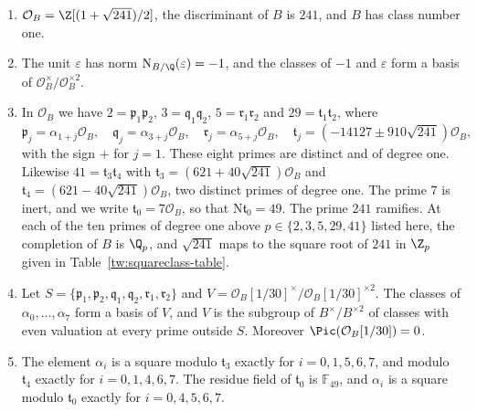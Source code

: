 \begin{lemma}\label{tw:base}
\begin{enumerate}
\item[(a)] $\mathcal O_B=\Z[(1+\sqrt{241})/2]$, the discriminant of $B$ is
 $241$, and $B$ has class number one.
\item[(b)] The unit $\varepsilon$ has norm $\mathrm N_{B/\Q}(\varepsilon)=-1$, and the
 classes of $-1$ and $\varepsilon$ form a basis of
 $\mathcal O_B^\times/\mathcal O_B^{\times2}$.
\item[(c)] In $\mathcal O_B$ we have $2=\mathfrak p_1\mathfrak p_2$,
 $3=\mathfrak q_1\mathfrak q_2$, $5=\mathfrak r_1\mathfrak r_2$ and
 $29=\mathfrak t_1\mathfrak t_2$, where
 \[
  \mathfrak p_j=\alpha_{1+j}\mathcal O_B,\quad
  \mathfrak q_j=\alpha_{3+j}\mathcal O_B,\quad
  \mathfrak r_j=\alpha_{5+j}\mathcal O_B,\quad
  \mathfrak t_j=(-14127\pm910\sqrt{241})\mathcal O_B,
 \]
 with the sign $+$ for $j=1$. These eight primes are distinct and of degree
 one. Likewise $41=\mathfrak t_3\mathfrak t_4$ with
 $\mathfrak t_3=(621+40\sqrt{241})\mathcal O_B$ and
 $\mathfrak t_4=(621-40\sqrt{241})\mathcal O_B$, two distinct primes of degree
 one. The prime $7$ is inert, and we write $\mathfrak t_0=7\mathcal O_B$, so
 that $\mathrm N\mathfrak t_0=49$. The prime $241$ ramifies. At each of the ten
 primes of degree one above $p\in\{2,3,5,29,41\}$ listed here, the completion
 of $B$ is $\Q_p$, and $\sqrt{241}$ maps to the square root of $241$ in $\Z_p$
 given in Table~\ref{tw:squareclass-table}.
\item[(d)] Let $S=\{\mathfrak p_1,\mathfrak p_2,\mathfrak q_1,\mathfrak q_2,\mathfrak r_1,\mathfrak r_2\}$
 and $V=\mathcal O_B[1/30]^\times/\mathcal O_B[1/30]^{\times2}$. The classes
 of $\alpha_0,\dots,\alpha_7$ form a basis of $V$, and $V$ is the subgroup of
 $B^\times/B^{\times2}$ of classes with even valuation at every prime outside
 $S$. Moreover $\Pic(\mathcal O_B[1/30])=0$.
\item[(e)] The element $\alpha_i$ is a square modulo $\mathfrak t_3$ exactly
 for $i=0,1,5,6,7$, and modulo $\mathfrak t_4$ exactly for $i=0,1,4,6,7$.
 The residue field of $\mathfrak t_0$ is $\mathbb F_{49}$, and $\alpha_i$ is a
 square modulo $\mathfrak t_0$ exactly for $i=0,4,5,6,7$.
\end{enumerate}
\end{lemma}


